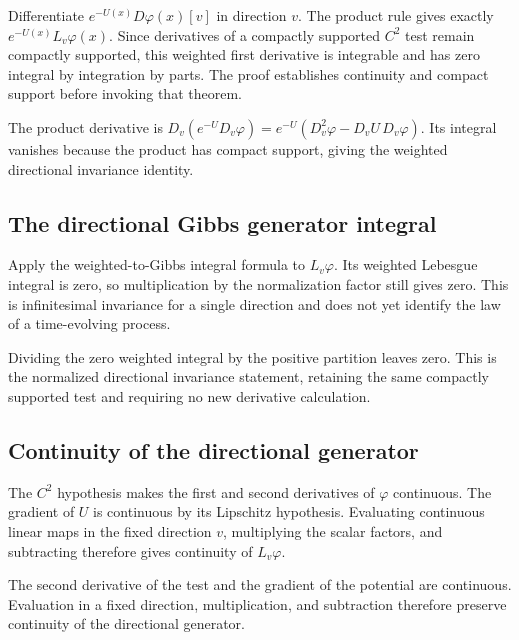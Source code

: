 \documentclass[11pt,a4paper]{report}
\begin{document}
Differentiate \(e^{-U(x)}D\varphi(x)[v]\) in direction \(v\). The product rule gives exactly \(e^{-U(x)}L_v\varphi(x)\). Since derivatives of a compactly supported \(C^2\) test remain compactly supported, this weighted first derivative is integrable and has zero integral by integration by parts. The proof establishes continuity and compact support before invoking that theorem.



The product derivative is \(D_v(e^{-U}D_v\varphi)=e^{-U}(D_v^2\varphi-D_vU\,D_v\varphi)\). Its integral vanishes because the product has compact support, giving the weighted directional invariance identity.

\subsection{\texorpdfstring{The directional Gibbs generator integral}{The directional Gibbs generator integral}}
\label{report-step-UnadjustedLangevin-Generator-lean-7}


Apply the weighted-to-Gibbs integral formula to \(L_v\varphi\). Its weighted Lebesgue integral is zero, so multiplication by the normalization factor still gives zero. This is infinitesimal invariance for a single direction and does not yet identify the law of a time-evolving process.



Dividing the zero weighted integral by the positive partition leaves zero. This is the normalized directional invariance statement, retaining the same compactly supported test and requiring no new derivative calculation.

\subsection{\texorpdfstring{Continuity of the directional generator}{Continuity of the directional generator}}
\label{report-step-UnadjustedLangevin-Generator-lean-8}


The \(C^2\) hypothesis makes the first and second derivatives of \(\varphi\) continuous. The gradient of \(U\) is continuous by its Lipschitz hypothesis. Evaluating continuous linear maps in the fixed direction \(v\), multiplying the scalar factors, and subtracting therefore gives continuity of \(L_v\varphi\).



The second derivative of the test and the gradient of the potential are continuous. Evaluation in a fixed direction, multiplication, and subtraction therefore preserve continuity of the directional generator.
\end{document}
